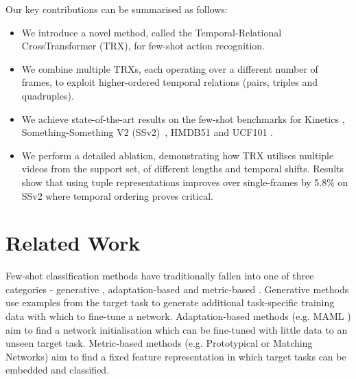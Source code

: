 \documentclass[final]{cvpr}
\begin{document}
\noindent Our key contributions can be summarised as follows:
\vspace{-1mm}
\begin{itemize}[leftmargin=*,itemsep=-3ex,partopsep=1ex,parsep=1ex]
    \setlength\itemsep{-0.15em}
    \item We introduce a novel method, called the Temporal-Relational CrossTransformer (TRX), for few-shot action recognition.
    \item We combine multiple TRXs, each operating over a different number of frames, to exploit higher-ordered temporal relations (pairs, triples and quadruples).
    \item We achieve state-of-the-art results on the few-shot benchmarks for Kinetics \cite{Carreira}, Something-Something V2 (SSv2)~\cite{Goyal2017}, HMDB51 \cite{Kuehnea} and UCF101 \cite{Soomro2012}.
    \item We perform a detailed ablation, demonstrating how TRX utilises multiple videos from the support set, of different lengths and temporal shifts. 
    Results show that using tuple representations improves over single-frames by 5.8\% on SSv2 where temporal ordering proves critical. 

\end{itemize}




\section{Related Work}\label{sec:related}
\vspace{-1pt}


Few-shot classification methods have traditionally fallen into one of three categories - generative \cite{Zhang2018,Dwivedi2019}, adaptation-based \cite{Finn2017,Nichol} and metric-based \cite{Vinyals2016,Snell2017}.  Generative methods use examples from the target task to generate additional task-specific training data with which to fine-tune a network.  Adaptation-based methods (e.g. MAML \cite{Finn2017}) aim to find a network initialisation which can be fine-tuned with little data to an unseen target task.
Metric-based methods (e.g. Prototypical \cite{Snell2017} or Matching \cite{Vinyals2016} Networks) aim to find a fixed feature representation in which target tasks can be embedded and classified. 
\end{document}
